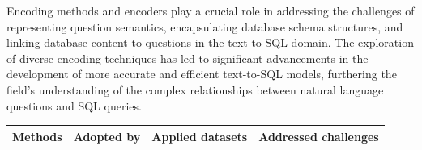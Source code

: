 Encoding methods and encoders play a crucial role in addressing the challenges of representing question semantics, encapsulating database schema structures, and linking database content to questions in the text-to-SQL domain. The exploration of diverse encoding techniques has led to significant advancements in the development of more accurate and efficient text-to-SQL models, furthering the field's understanding of the complex relationships between natural language questions and SQL queries\cite{deng2022recent}.

\begin{table}[H]
    \centering
    \begin{tabular}{|c|c|c|c|}
        \hline
        \rowcolor{Gray}
        \textbf{Methods}                & \textbf{Adopted by} & \textbf{Applied datasets} & \textbf{Addressed challenges}                                                                              \\
        \hline


\end{tabular}
\end{table}
